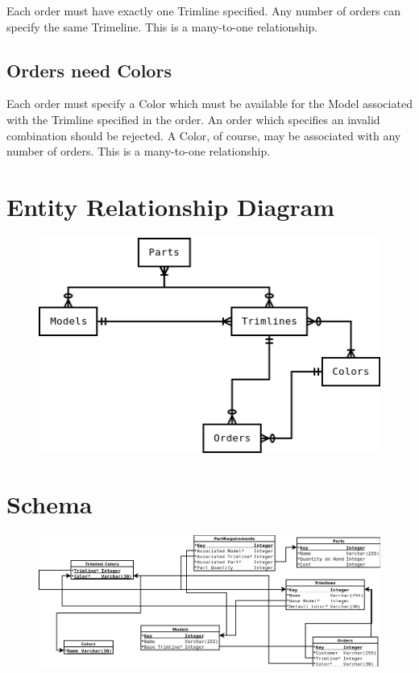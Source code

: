 \documentclass[11pt,letterpaper,oneside]{amsart}
\begin{document}
Each order must have exactly one Trimline specified.  Any number of orders can specify the same Trimeline.  This is a many-to-one relationship.

\subsection*{Orders need Colors}

Each order must specify a Color which must be available for the Model associated with the Trimline specified in the order.  An order which specifies an invalid combination should be rejected.  A Color, of course, may be associated with any number of orders.  This is a many-to-one relationship.

\section*{Entity Relationship Diagram}

\begin{figure}[H]
	\centerline{\includegraphics[scale=1.2]{erddraft.png}}
\end{figure}

\section*{Schema}

\begin{figure}[H]
	\centerline{\includegraphics[scale=.55]{schema.png}}
\end{figure}
\end{document}
